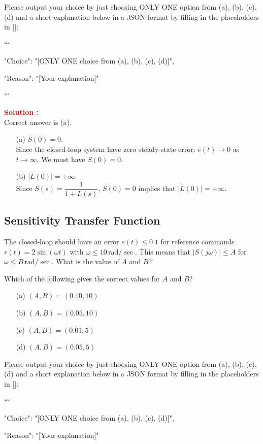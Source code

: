 \documentclass[12pt]{article}
\begin{document}
Please output your choice by just choosing ONLY ONE option from (a), (b), (c), (d) and a short explanation below in a JSON format by filling in the placeholders in []:

```
{

"Choice": "[ONLY ONE choice from (a), (b), (c), (d)]",

"Reason": "[Your explanation]"

}

```

\textbf{\textcolor{red}{Solution :}} \\
Correct answer is (a).\\
\begin{itemize}
    \item[(a)] $S(0) = 0$.  \\
    Since the closed-loop system have zero steady-state error: $e(t) \to 0$ as $t \to \infty$. We must have $S(0) = 0$. 
    \item[(b)] $|L(0)| = +\infty$.  \\
    Since $S(s) = \dfrac{1}{1+L(s)}$, $S(0) = 0$ implies that $|L(0)| = +\infty$.  
\end{itemize}
\clearpage

\subsection{Sensitivity Transfer Function}

The closed-loop should have an error $e(t) \le 0.1$ for reference commands $r(t) = 2 \sin(\omega t)$  with $\omega \le 10 \,\text{rad}/\sec$. This means that $|S(j\omega)|\le A$ for $\omega \le B\,\text{rad}/\sec$. What is the value of $A$ and $B$?

Which of the following gives the correct values for $A$ and $B$?

\begin{itemize}
    \item[(a)] $(A,B)=(0.10, 10)$
    \item[(b)] $(A,B)=(0.05,10)$
    \item[(c)] $(A,B)=(0.01, 5)$
    \item[(d)] $(A,B)=(0.05, 5)$
\end{itemize}


Please output your choice by just choosing ONLY ONE option from (a), (b), (c), (d) and a short explanation below in a JSON format by filling in the placeholders in []:

```
{

"Choice": "[ONLY ONE choice from (a), (b), (c), (d)]",

"Reason": "[Your explanation]"

}
\end{document}
